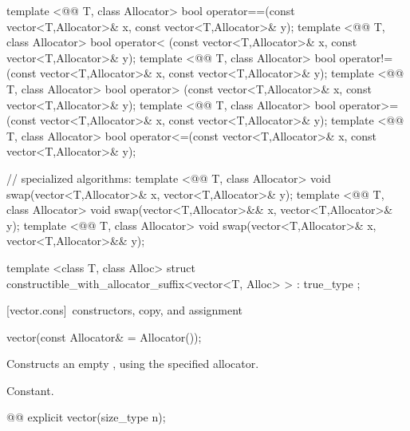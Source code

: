 \documentclass[american,twoside]{book}
\begin{document}
\begin{codeblock}
{  template <@@ T, class Allocator>
    bool operator==(const vector<T,Allocator>& x, const vector<T,Allocator>& y);
  template <@@ T, class Allocator>
    bool operator< (const vector<T,Allocator>& x, const vector<T,Allocator>& y);
  template <@@ T, class Allocator>
    bool operator!=(const vector<T,Allocator>& x, const vector<T,Allocator>& y);
  template <@@ T, class Allocator>
    bool operator> (const vector<T,Allocator>& x, const vector<T,Allocator>& y);
  template <@@ T, class Allocator>
    bool operator>=(const vector<T,Allocator>& x, const vector<T,Allocator>& y);
  template <@@ T, class Allocator>
    bool operator<=(const vector<T,Allocator>& x, const vector<T,Allocator>& y);

  // specialized algorithms:
  template <@@ T, class Allocator>
    void swap(vector<T,Allocator>& x, vector<T,Allocator>& y);
  template <@@ T, class Allocator>
    void swap(vector<T,Allocator>&& x, vector<T,Allocator>& y);
  template <@@ T, class Allocator>
    void swap(vector<T,Allocator>& x, vector<T,Allocator>&& y);

  template <class T, class Alloc>
    struct constructible_with_allocator_suffix<vector<T, Alloc> >
      : true_type { };
}
\end{codeblock}%
%

[vector.cons]{\ constructors, copy, and assignment}

\begin{itemdecl}
vector(const Allocator& = Allocator());
\end{itemdecl}

\begin{itemdescr}
\pnum
\effects Constructs an empty , using the
specified allocator.

\pnum
\complexity Constant.
\end{itemdescr}

\begin{itemdecl}
@@ explicit vector(size_type n);
\end{itemdecl}
\end{document}
